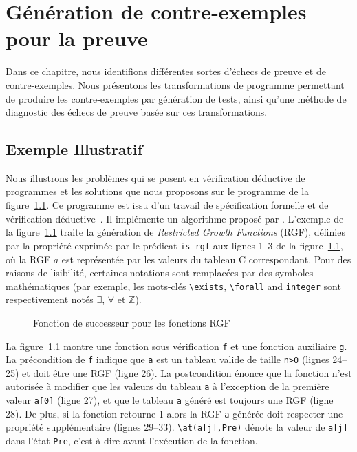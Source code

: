 
\chapter{Génération de contre-exemples pour la preuve}
\label{sec:ce}

\chapterintro

Dans ce chapitre, nous identifions différentes sortes d'échecs de preuve et de
contre-exemples.
Nous présentons les transformations de programme permettant de produire les
contre-exemples par génération de tests, ainsi qu'une méthode de diagnostic des
échecs de preuve basée sur ces transformations.



\section{Exemple Illustratif}
\label{sec:ce-example}


Nous illustrons les problèmes qui se posent en vérification déductive de
programmes et les solutions que nous proposons sur le programme de la
figure~\ref{fig:rgf1}.
Ce programme est issu d'un travail de spécification formelle et de vérification
déductive~\cite{Genestier/TAP15}.
Il implémente un algorithme proposé par \cite[page 235]{Arndt/10}.
L'exemple de la figure~\ref{fig:rgf1} traite la génération de
{\em Restricted Growth Functions} (RGF), définies par la propriété exprimée par
le prédicat \eacsl \lstinline{is_rgf} aux lignes 1--3 de la
figure~\ref{fig:rgf1}, où la RGF $a$ est représentée par les valeurs du tableau
C correspondant.
Pour des raisons de lisibilité, certaines notations \eacsl sont remplacées par
des symboles mathématiques (par exemple, les mots-clés 
\lstinline[style=c]{\exists}, \lstinline[style=c]{\forall} and
\lstinline[style=c]{integer} sont respectivement notés $\exists$, $\forall$ et
$\mathbb{Z}$).


\begin{figure}[tb]
  \centering
  
  \caption{Fonction de successeur pour les fonctions RGF\label{fig:rgf1}}
\end{figure}


La figure~\ref{fig:rgf1} montre une fonction sous vérification \lstinline{f} 
et une fonction auxiliaire \lstinline{g}.
La précondition de \lstinline{f} indique que \lstinline{a} est un tableau valide
de taille \lstinline{n>0} (lignes 24--25) et doit être une RGF (ligne 26).
La postcondition énonce que la fonction n'est autorisée à modifier que les
valeurs du tableau \lstinline{a} à l'exception de la première valeur
\lstinline{a[0]} (ligne 27), et que le tableau \lstinline{a} généré est toujours
une RGF (ligne 28).
De plus, si la fonction retourne 1 alors la RGF \lstinline{a} générée doit
respecter une propriété supplémentaire (lignes 29--33).
\lstinline{\at(a[j],Pre)} dénote la valeur de \lstinline{a[j]} dans l'état
\lstinline{Pre}, c'est-à-dire avant l'exécution de la fonction.


